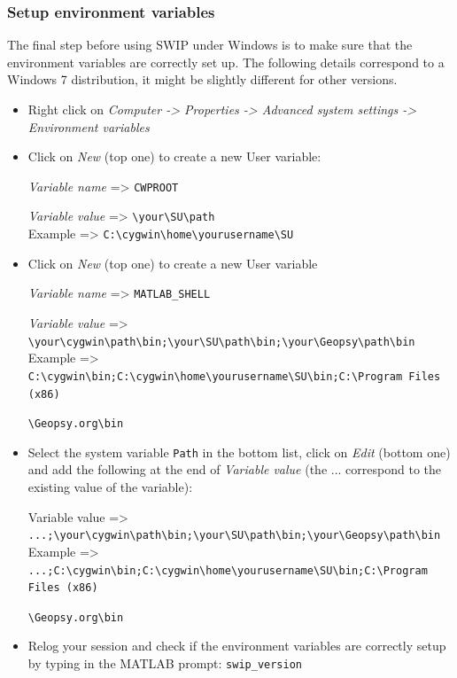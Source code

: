 \documentclass[twoside,a4paper]{article}
\begin{document}
\subsubsection{Setup environment variables}
The final step before using SWIP under Windows is to make sure that the environment variables are correctly set up. The following details correspond to a Windows 7 distribution, it might be slightly different for other versions.
\begin{itemize}
\setlength\itemsep{2ex}
\setlength{\parindent}{5ex}
\item Right click on \textit{Computer -> Properties -> Advanced system settings -> Environment variables}

\item Click on \textit{New} (top one) to create a new User variable:

\textit{Variable name} => \verb|CWPROOT|

\textit{Variable value} => \verb|\your\SU\path|\\
Example => \verb|C:\cygwin\home\yourusername\SU|

\item Click on \textit{New} (top one) to create a new User variable

\textit{Variable name} => \verb|MATLAB_SHELL|

\textit{Variable value} => \verb|\your\cygwin\path\bin;\your\SU\path\bin;\your\Geopsy\path\bin|\\
Example => \verb|C:\cygwin\bin;C:\cygwin\home\yourusername\SU\bin;C:\Program Files (x86)|

\verb|\Geopsy.org\bin|

\item Select the system variable \verb|Path| in the bottom list, click on \textit{Edit} (bottom one) and add the following at the end of \textit{Variable value} (the ... correspond to the existing value of the variable):

Variable value => \verb|...;\your\cygwin\path\bin;\your\SU\path\bin;\your\Geopsy\path\bin|\\
Example => \verb|...;C:\cygwin\bin;C:\cygwin\home\yourusername\SU\bin;C:\Program Files (x86)|

\verb|\Geopsy.org\bin|

\item Relog your session and check if the environment variables are correctly setup by typing in the MATLAB prompt: \verb|swip_version| %

\end{itemize}
\end{document}
